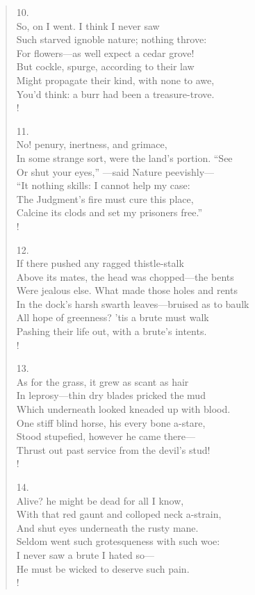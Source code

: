 \documentclass[10pt]{memoir}
\begin{document}
\begin{verse}
10.\\
So, on I went. I think I never saw\\
\vin Such starved ignoble nature; nothing throve:\\
\vin For flowers---as well expect a cedar grove!\\
But cockle, spurge, according to their law\\
Might propagate their kind, with none to awe,\\
\vin You'd think: a burr had been a treasure-trove.\\!

11.\\
No! penury, inertness, and grimace,\\
\vin In some strange sort, were the land's portion. ``See\\
\vin Or shut your eyes,'' ---said Nature peevishly---\\
``It nothing skills: I cannot help my case:\\
The Judgment's fire must cure this place,\\
\vin Calcine its clods and set my prisoners free.''\\!

12.\\
If there pushed any ragged thistle-stalk\\
\vin Above its mates, the head was chopped---the bents\\
\vin Were jealous else. What made those holes and rents\\
In the dock's harsh swarth leaves---bruised as to baulk\\
All hope of greenness? 'tis a brute must walk\\
\vin Pashing their life out, with a brute's intents.\\!

13.\\
As for the grass, it grew as scant as hair\\
\vin In leprosy---thin dry blades pricked the mud\\
\vin Which underneath looked kneaded up with blood.\\
One stiff blind horse, his every bone a-stare,\\
Stood stupefied, however he came there---\\
\vin Thrust out past service from the devil's stud!\\!

14.\\
Alive? he might be dead for all I know,\\
\vin With that red gaunt and colloped neck a-strain,\\
\vin And shut eyes underneath the rusty mane.\\
Seldom went such grotesqueness with such woe:\\
I never saw a brute I hated so---\\
\vin He must be wicked to deserve such pain.\\!


\end{verse}
\end{document}
